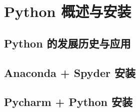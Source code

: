 \chapter{Python 概述与安装}
\section{Python 的发展历史与应用}

\section{Anaconda + Spyder 安装}

\section{Pycharm + Python 安装}
